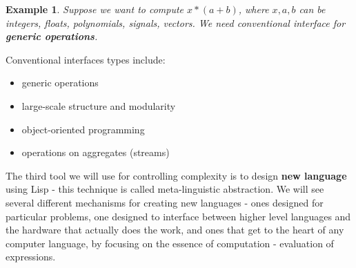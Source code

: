 \documentclass[a4paper,twoside]{article}
\newtheorem{example}[theorem]{Example}
\numberwithin{equation}{section}
\begin{document}
\begin{example}
    Suppose we want to compute $x*(a+b)$, where $x, a, b$ can be integers, floats, polynomials,
    signals, vectors. We need conventional interface for \textbf{generic operations}.
\end{example}
Conventional interfaces types include:
\begin{itemize}
    \item generic operations
    \item large-scale structure and modularity
    \item object-oriented programming
    \item operations on aggregates (streams)
\end{itemize}
The third tool we will use for controlling complexity is to design \textbf{new language} using Lisp
- this technique is called meta-linguistic abstraction. We will see several different mechanisms
for creating new languages - ones designed for particular
problems, one designed to interface between higher level
languages and the hardware that actually does the work, and
ones that get to the heart of any computer language, by focusing
on the essence of computation - evaluation of expressions.
\end{document}
